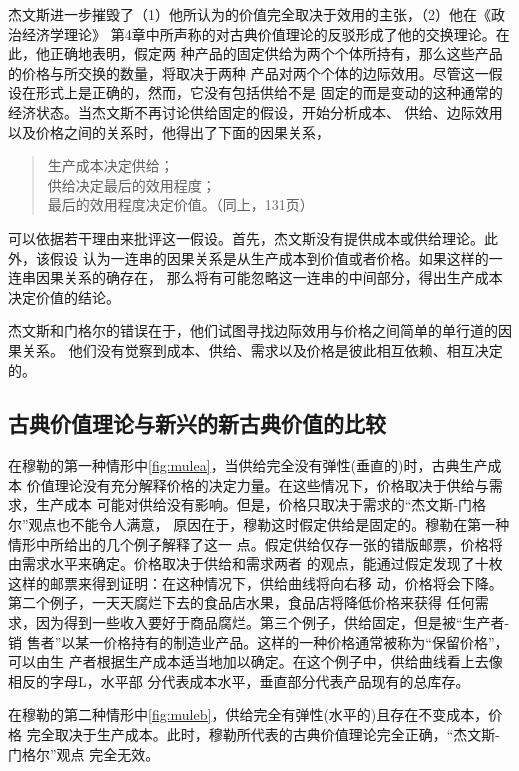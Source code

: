 杰文斯进一步摧毁了（1）他所认为的价值完全取决于效用的主张，（2）他在《政治经济学理论》
第4章中所声称的对古典价值理论的反驳形成了他的交换理论。在此，他正确地表明，假定两
种产品的固定供给为两个个体所持有，那么这些产品的价格与所交换的数量，将取决于两种
产品对两个个体的边际效用。尽管这一假设在形式上是正确的，然而，它没有包括供给不是
固定的而是变动的这种通常的经济状态。当杰文斯不再讨论供给固定的假设，开始分析成本、
供给、边际效用以及价格之间的关系时，他得出了下面的因果关系，

\begin{quotation}
  \noindent 生产成本决定供给；\\
  供给决定最后的效用程度；\\
  最后的效用程度决定价值。（同上，131页）
\end{quotation}

可以依据若干理由来批评这一假设。首先，杰文斯没有提供成本或供给理论。此外，该假设
认为一连串的因果关系是从生产成本到价值或者价格。如果这样的一连串因果关系的确存在，
那么将有可能忽略这一连串的中间部分，得出生产成本决定价值的结论。

杰文斯和门格尔的错误在于，他们试图寻找边际效用与价格之间简单的单行道的因果关系。
他们没有觉察到成本、供给、需求以及价格是彼此相互依赖、相互决定的。

\subsection{古典价值理论与新兴的新古典价值的比较}

在穆勒的第一种情形中\cref{fig:mulea}，当供给完全没有弹性(垂直的)时，古典生产成本
价值理论没有充分解释价格的决定力量。在这些情况下，价格取决于供给与需求，生产成本
可能对供给没有影响。但是，价格只取决于需求的“杰文斯-门格尔”观点也不能令人满意，
原因在于，穆勒这时假定供给是固定的。穆勒在第一种情形中所给出的几个例子解释了这一
点。假定供给仅存一张的错版邮票，价格将由需求水平来确定。价格取决于供给和需求两者
的观点，能通过假定发现了十枚这样的邮票来得到证明：在这种情况下，供给曲线将向右移
动，价格将会下降。第二个例子，一天天腐烂下去的食品店水果，食品店将降低价格来获得
任何需求，因为得到一些收入要好于商品腐烂。第三个例子，供给固定，但是被“生产者-销
售者”以某一价格持有的制造业产品。这样的一种价格通常被称为“保留价格”，可以由生
产者根据生产成本适当地加以确定。在这个例子中，供给曲线看上去像相反的字母L，水平部
分代表成本水平，垂直部分代表产品现有的总库存。

在穆勒的第二种情形中\cref{fig:muleb}，供给完全有弹性(水平的)且存在不变成本，价格
完全取决于生产成本。此时，穆勒所代表的古典价值理论完全正确，“杰文斯-门格尔”观点
完全无效。


